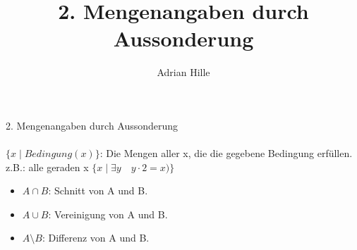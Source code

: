 \documentclass{scrartcl}\usepackage[utf8]{inputenc}
\title{2. Mengenangaben durch Aussonderung}
\author{Adrian Hille}
\begin{document}
\Large 2. Mengenangaben durch Aussonderung
\\
\\
\normalsize
$\{x \mid Bedingung (x) \}$:  Die Mengen aller x, die die gegebene Bedingung erf\"ullen.\\
z.B.: alle geraden x
$\{x \mid \exists y \quad y\cdot 2=x) \}$
\\
  \begin{itemize}
    	\item $A \cap B$: Schnitt von A und B.
    	\item $A \cup B$: Vereinigung von A und B.
  	\item $A \setminus B$: Differenz von A und B.
    \end{itemize}
\end{document}
